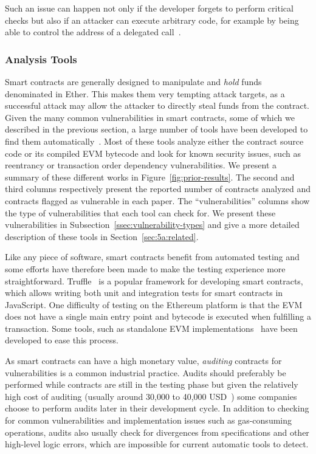 Such an issue can happen not only if the developer forgets to perform critical checks but also if an attacker can execute arbitrary code, for example by being able to control the address of a delegated call~\cite{Krupp2018}.



\subsubsection{Analysis Tools}
\label{ssec:analysis-tools}
Smart contracts are generally designed to manipulate and \emph{hold} funds denominated in Ether. This makes them very tempting attack targets, as a successful attack may allow the attacker to directly steal funds from the contract.
Given the many common vulnerabilities in smart contracts, some of which we described in the previous section, a large number of tools have been developed to find them automatically~\cite{Luu2016a,Tsankov2018,mythril}.
Most of these tools analyze either the contract source code or its compiled EVM bytecode and look for known security issues, such as reentrancy or transaction order dependency vulnerabilities. We present a summary of these different works in Figure~\ref{fig:prior-results}. The second and third columns respectively present the reported number of contracts analyzed and contracts flagged as vulnerable in each paper. The ``vulnerabilities'' columns show the type of vulnerabilities that each tool can check for. We present these vulnerabilities in Subsection~\ref{ssec:vulnerability-types} and give a more detailed description of these tools in Section~\ref{sec:5a:related}.

Like any piece of software, smart contracts benefit from automated testing and some efforts have therefore been made to make the testing experience more straightforward. Truffle~\cite{truffle} is a popular framework for developing smart contracts, which allows writing both unit and integration tests for smart contracts in JavaScript. One difficulty of testing on the Ethereum platform is that the EVM does not have a single main entry point and bytecode is executed when fulfilling a transaction. Some tools, such as standalone EVM implementations~\cite{ganache} have been developed to ease this process.

As smart contracts can have a high monetary value, \emph{auditing} contracts for vulnerabilities is a common industrial practice.
Audits should preferably be performed while contracts are still in the testing phase but given the relatively high cost of auditing (usually around 30,000 to 40,000 USD~\cite{solidified}) some companies choose to perform audits later in their development cycle. In addition to checking for common vulnerabilities and implementation issues such as gas-consuming operations, audits also usually check for divergences from specifications and other high-level logic errors, which are impossible for current automatic tools to detect.

